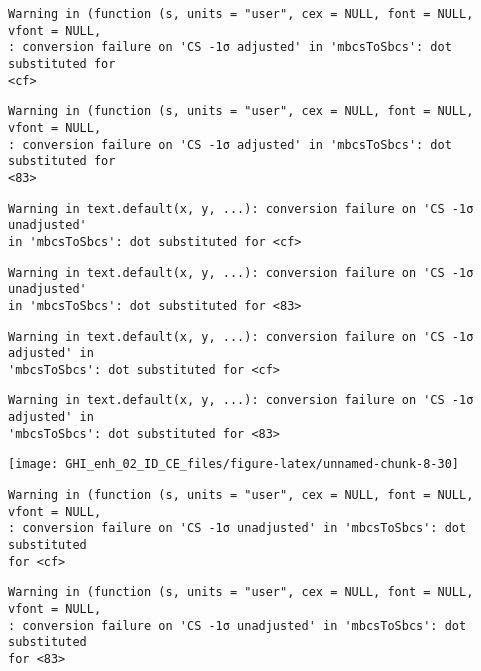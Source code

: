 \documentclass[
  10pt,
  a4paper,oneside]{article}
\begin{document}
\begin{verbatim}
Warning in (function (s, units = "user", cex = NULL, font = NULL, vfont = NULL,
: conversion failure on 'CS -1σ adjusted' in 'mbcsToSbcs': dot substituted for
<cf>
\end{verbatim}

\begin{verbatim}
Warning in (function (s, units = "user", cex = NULL, font = NULL, vfont = NULL,
: conversion failure on 'CS -1σ adjusted' in 'mbcsToSbcs': dot substituted for
<83>
\end{verbatim}

\begin{verbatim}
Warning in text.default(x, y, ...): conversion failure on 'CS -1σ unadjusted'
in 'mbcsToSbcs': dot substituted for <cf>
\end{verbatim}

\begin{verbatim}
Warning in text.default(x, y, ...): conversion failure on 'CS -1σ unadjusted'
in 'mbcsToSbcs': dot substituted for <83>
\end{verbatim}

\begin{verbatim}
Warning in text.default(x, y, ...): conversion failure on 'CS -1σ adjusted' in
'mbcsToSbcs': dot substituted for <cf>
\end{verbatim}

\begin{verbatim}
Warning in text.default(x, y, ...): conversion failure on 'CS -1σ adjusted' in
'mbcsToSbcs': dot substituted for <83>
\end{verbatim}

\begin{center}\texttt{[image: GHI\_enh\_02\_ID\_CE\_files/figure-latex/unnamed-chunk-8-30]} \end{center}

\begin{verbatim}
Warning in (function (s, units = "user", cex = NULL, font = NULL, vfont = NULL,
: conversion failure on 'CS -1σ unadjusted' in 'mbcsToSbcs': dot substituted
for <cf>
\end{verbatim}

\begin{verbatim}
Warning in (function (s, units = "user", cex = NULL, font = NULL, vfont = NULL,
: conversion failure on 'CS -1σ unadjusted' in 'mbcsToSbcs': dot substituted
for <83>
\end{verbatim}
\end{document}
